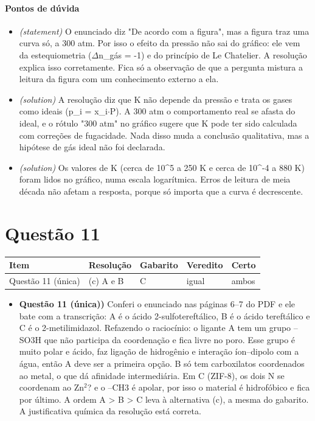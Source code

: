\documentclass{article}%
\begin{document}
\paragraph{Pontos de dúvida}%
\begin{itemize}%
\item%
\textit{(statement)} O enunciado diz "De acordo com a figura", mas a figura traz uma curva só, a 300 atm. Por isso o efeito da pressão não sai do gráfico: ele vem da estequiometria ($\Delta$n\_gás = -1) e do princípio de Le Chatelier. A resolução explica isso corretamente. Fica só a observação de que a pergunta mistura a leitura da figura com um conhecimento externo a ela.%
\item%
\textit{(solution)} A resolução diz que K não depende da pressão e trata os gases como ideais (p\_i = x\_i$\cdot$P). A 300 atm o comportamento real se afasta do ideal, e o rótulo "300 atm" no gráfico sugere que K pode ter sido calculada com correções de fugacidade. Nada disso muda a conclusão qualitativa, mas a hipótese de gás ideal não foi declarada.%
\item%
\textit{(solution)} Os valores de K (cerca de 10\^{}5 a 250 K e cerca de 10\^{}{-}4 a 880 K) foram lidos no gráfico, numa escala logarítmica. Erros de leitura de meia década não afetam a resposta, porque só importa que a curva é decrescente.%
\end{itemize}%
\section*{Questão 11}%
\begin{longtable}{@{}p{} p{} p{} p{} p{}@{}}\toprule Item & Resolução & Gabarito & Veredito & Certo \\ \midrule
Questão 11 (única) & (c) A e B & C & igual & ambos \\
\bottomrule\end{longtable}%
\begin{itemize}%
\item%
\textbf{Questão 11 (única))} Conferi o enunciado nas páginas 6--7 do PDF e ele bate com a transcrição: A é o ácido 2{-}sulfotereftálico, B é o ácido tereftálico e C é o 2{-}metilimidazol. Refazendo o raciocínio: o ligante A tem um grupo --SO3H que não participa da coordenação e fica livre no poro. Esse grupo é muito polar e ácido, faz ligação de hidrogênio e interação íon--dipolo com a água, então A deve ser a primeira opção. B só tem carboxilatos coordenados ao metal, o que dá afinidade intermediária. Em C (ZIF{-}8), os dois N se coordenam ao Zn$^2$? e o --CH3 é apolar, por isso o material é hidrofóbico e fica por último. A ordem A > B > C leva à alternativa (c), a mesma do gabarito. A justificativa química da resolução está correta.%
\end{itemize}%
\end{document}
